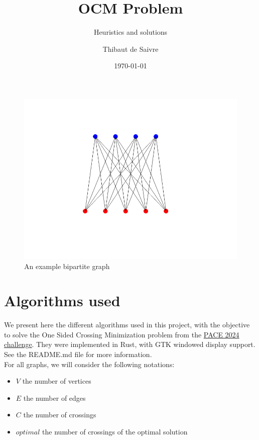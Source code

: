 \documentclass[a4paper]{article}
\author{Thibaut de Saivre}
\date{\today}
\title{OCM Problem}
\subtitle{Heuristics and solutions}
\begin{document}
\maketitle

\tableofcontents

\begin{figure}[ht]
	\centering
	\includegraphics[width=1\textwidth]{images/graph_example.png}
	\caption{An example bipartite graph}
	\label{fig:image1} %
\end{figure}

\eject

\section{Algorithms used}

We present here the different algorithms used in this project, with the objective to solve the One Sided Crossing Minimization problem from the \href{https://pacechallenge.org/2024/}{PACE 2024 challenge}. They were implemented in Rust, with GTK windowed display support. See the README.md file for more information.\\

For all graphs, we will consider the following notations:
\begin{itemize}
	\item $V$ the number of vertices
	\item $E$ the number of edges
	\item $C$ the number of crossings
	\item $optimal$ the number of crossings of the optimal solution\\
\end{itemize}
\end{document}
